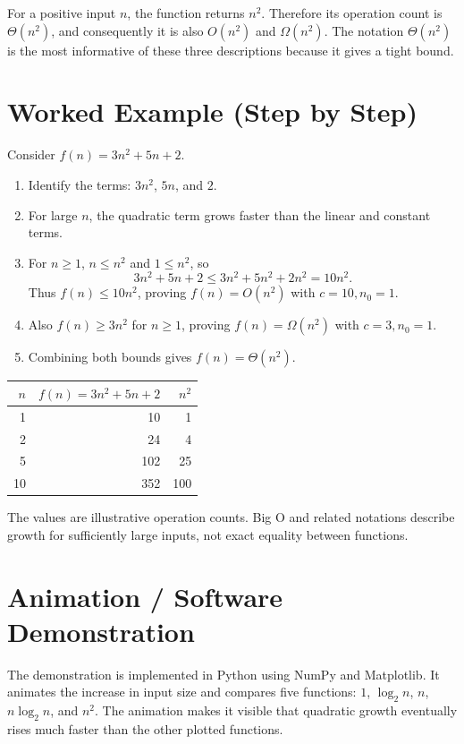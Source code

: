 \documentclass[11pt,a4paper]{article}
\begin{document}
For a positive input $n$, the function returns $n^2$. Therefore its operation count is $\Theta(n^2)$, and consequently it is also $O(n^2)$ and $\Omega(n^2)$. The notation $\Theta(n^2)$ is the most informative of these three descriptions because it gives a tight bound.

\section{Worked Example (Step by Step)}
Consider $f(n)=3n^2+5n+2$.

\begin{enumerate}
\item Identify the terms: $3n^2$, $5n$, and $2$.
\item For large $n$, the quadratic term grows faster than the linear and constant terms.
\item For $n\ge 1$, $n\le n^2$ and $1\le n^2$, so
\[
3n^2+5n+2\le 3n^2+5n^2+2n^2=10n^2.
\]
Thus $f(n)\le 10n^2$, proving $f(n)=O(n^2)$ with $c=10,n_0=1$.
\item Also $f(n)\ge 3n^2$ for $n\ge1$, proving $f(n)=\Omega(n^2)$ with $c=3,n_0=1$.
\item Combining both bounds gives $f(n)=\Theta(n^2)$.
\end{enumerate}

\begin{center}
\begin{tabular}{rrr}
\toprule
$n$ & $f(n)=3n^2+5n+2$ & $n^2$\\
\midrule
1 & 10 & 1\\
2 & 24 & 4\\
5 & 102 & 25\\
10 & 352 & 100\\
\bottomrule
\end{tabular}
\end{center}
The values are illustrative operation counts. Big O and related notations describe growth for sufficiently large inputs, not exact equality between functions.

\section{Animation / Software Demonstration}
The demonstration is implemented in Python using NumPy and Matplotlib. It animates the increase in input size and compares five functions: $1$, $\log_2 n$, $n$, $n\log_2 n$, and $n^2$. The animation makes it visible that quadratic growth eventually rises much faster than the other plotted functions.
\end{document}
